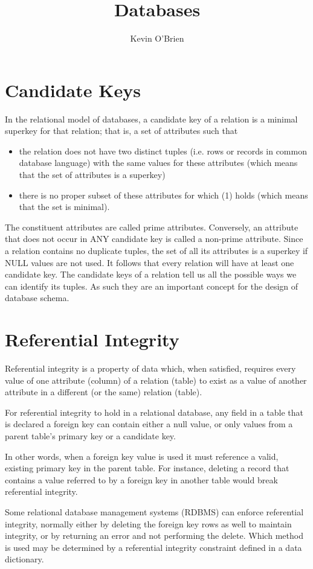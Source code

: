 \documentclass[]{article}
\title{Databases}
\author{Kevin O'Brien}
\begin{document}
\maketitle
\tableofcontents
\newpage
\section{Candidate Keys}
In the relational model of databases, a candidate key of a relation is a minimal superkey for that relation; that is, a set of attributes such that
\begin{itemize}
\item the relation does not have two distinct tuples (i.e. rows or records in common database language) with the same values for these attributes (which means that the set of attributes is a superkey)
\item there is no proper subset of these attributes for which (1) holds (which means that the set is minimal).
\end{itemize}
The constituent attributes are called prime attributes. Conversely, an attribute that does not occur in ANY candidate key is called a non-prime attribute.
Since a relation contains no duplicate tuples, the set of all its attributes is a superkey if NULL values are not used. It follows that every relation will have at least one candidate key.
The candidate keys of a relation tell us all the possible ways we can identify its tuples. As such they are an important concept for the design of database schema.


\section{Referential Integrity}
Referential integrity is a property of data which, when satisfied, requires every value of one attribute (column) of a relation (table) to exist as a value of another attribute in a different (or the same) relation (table).

For referential integrity to hold in a relational database, any field in a table that is declared a foreign key can contain either a null value, or only values from a parent table's primary key or a candidate key.

In other words, when a foreign key value is used it must reference a valid, existing primary key in the parent table. For instance, deleting a record that contains a value referred to by a foreign key in another table would break referential integrity. 

Some relational database management systems (RDBMS) can enforce referential integrity, normally either by deleting the foreign key rows as well to maintain integrity, or by returning an error and not performing the delete. Which method is used may be determined by a referential integrity constraint defined in a data dictionary.
\end{document}
